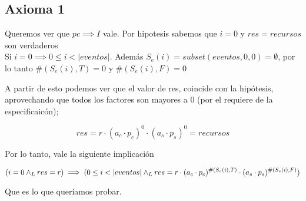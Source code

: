 \documentclass[../document.tex]{subfiles}
\begin{document}
\subsection*{Axioma 1}
Queremos ver que $pc\implies I$ vale. Por hipotesis sabemos que $i=0$ y $res=recursos$ son verdaderos\\

Si $i=0 \implies 0\leq i < |eventos|$. Además $S_e(i)=subset(eventos,0,0)=\emptyset$, por lo tanto $\#(S_e(i),T)=0$ y $\#(S_e(i),F)=0$

A partir de esto podemos ver que el valor de res, coincide con la hipótesis, aprovechando que todos los factores son mayores a 0 (por el requiere de la especificaicón);

\begin{equation}
res=r\cdot(a_c\cdot p_c)^0\cdot (a_s\cdot p_s)^0=recursos
\end{equation}

Por lo tanto, vale la siguiente implicación

\begin{equation}
(i=0 \land _L res=r)\implies (0\leq i < |eventos| \land _L res=r\cdot(a_c\cdot p_c)^{\#(S_c(i),T)}\cdot(a_s\cdot p_s)^{\#(S_s(i),F)})
\end{equation}

Que es lo que queríamos probar.











\end{document}
